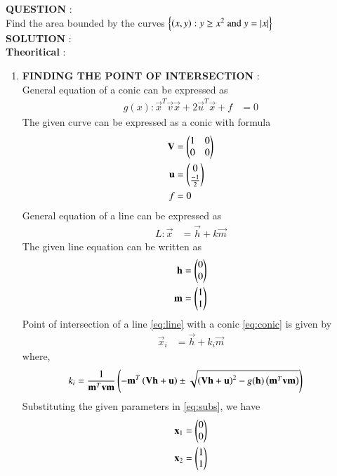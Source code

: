 \documentclass[journal]{IEEEtran}
\begin{document}
\textbf{QUESTION} : \\
Find the area bounded by the curves $\left\{\left(x,y\right) : y \geq x^2  \text{ and } y = \left\vert x\right\vert \right\}$ \\
\textbf{SOLUTION} : \\
\textbf{Theoritical} : \\
\begin{enumerate}
	\item \textbf{FINDING THE POINT OF INTERSECTION} : \\
		General equation of a conic can be expressed as
		\begin{align}
			g(x) : \vec{x}^T\vec{v}\vec{x} + 2\vec{u}^T\vec{x} + f &= 0 \label{eq:conic}
		\end{align}
		The given curve can be expressed as a conic with formula
		\begin{align}
			\mathbf{V} &= \begin{pmatrix} 1 & 0 \\ 0 & 0 \end{pmatrix} \\
			\mathbf{u} &= \begin{pmatrix} 0 \\ \frac{-1}{2} \end{pmatrix} \\
			f &= 0
		\end{align}
		General equation of a line can be expressed as
		\begin{align}
			L : \vec{x} &= \vec{h} + k\vec{m} \label{eq:line}
		\end{align}
		The given line equation can be written as
		\begin{align}
			\mathbf{h} &= \begin{pmatrix}0 \\ 0\end{pmatrix} \\
			\mathbf{m} &= \begin{pmatrix}1 \\ 1\end{pmatrix}
		\end{align}
		Point of intersection of a line \eqref{eq:line} with a conic \eqref{eq:conic} is given by
		\begin{align}
			\vec{x}_{i} &= \vec{h} + k_{i} \vec{m} \label{eq:subs}
		\end{align}
		where, 
		\begin{align}
			k_i &= \frac{1}{\mathbf{m}^T\mathbf{v}\mathbf{m}} \left( -\mathbf{m}^T \left(\mathbf{V}\mathbf{h} + \mathbf{u}\right) \pm \sqrt{ \left(\mathbf{V}\mathbf{h} + \mathbf{u}\right)^2 - g(\mathbf{h}) \left(\mathbf{m}^T\mathbf{v}\mathbf{m}\right)}\right) 
		\end{align}
		Substituting the given parameters in \eqref{eq:subs}, we have
		\begin{align}
			\vec{x}_1 &= \myvec{ 0 \\ 0 } \\
			\vec{x}_2 &= \myvec{ 1 \\ 1 } 

\end{align}
\end{enumerate}
\end{document}

